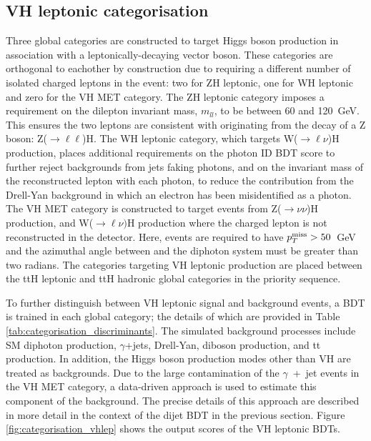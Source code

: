 \FloatBarrier

\subsection{VH leptonic categorisation}
Three global categories are constructed to target Higgs boson production in association with a leptonically-decaying vector boson. These categories are orthogonal to eachother by construction due to requiring a different number of isolated charged leptons in the event: two for ZH leptonic, one for WH leptonic and zero for the VH MET category. The ZH leptonic category imposes a requirement on the dilepton invariant mass, $m_{ll}$, to be between 60 and 120~GeV. This ensures the two leptons are consistent with originating from the decay of a Z boson: Z($\rightarrow\ell\ell$)H. The WH leptonic category, which targets W($\rightarrow\ell\nu$)H production, places additional requirements on the photon ID BDT score to further reject backgrounds from jets faking photons, and on the invariant mass of the reconstructed lepton with each photon, to reduce the contribution from the Drell-Yan background in which an electron has been misidentified as a photon. The VH MET category is constructed to target events from Z($\rightarrow\nu\nu$)H production, and W($\rightarrow\ell\nu)$H production where the charged lepton is not reconstructed in the detector. Here, events are required to have $p^\textrm{miss}_{T}>50$~GeV and the azimuthal angle between \metv and the diphoton system must be greater than two radians. The categories targeting VH leptonic production are placed between the ttH leptonic and ttH hadronic global categories in the priority sequence.

To further distinguish between VH leptonic signal and background events, a BDT is trained in each global category; the details of which are provided in Table \ref{tab:categorisation_discriminants}. The simulated background processes include SM diphoton production, $\gamma$+jets, Drell-Yan, diboson production, and tt production. In addition, the Higgs boson production modes other than VH are treated as backgrounds. Due to the large contamination of the $\gamma$~+~jet events in the VH MET category, a data-driven approach is used to estimate this component of the background. The precise details of this approach are described in more detail in the context of the dijet BDT in the previous section. Figure \ref{fig:categorisation_vhlep} shows the output scores of the VH leptonic BDTs.

